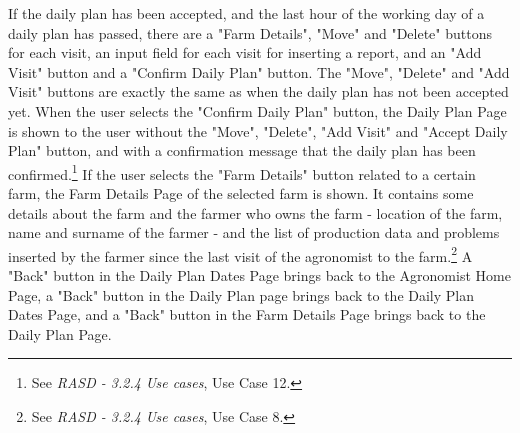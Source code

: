 \documentclass{article}
\begin{document}
If the daily plan has been accepted, and the last hour of the working day of a daily plan has passed, there are a "Farm Details", "Move" and "Delete" buttons for each visit, an input field for each visit for inserting a report, and an "Add Visit" button and a "Confirm Daily Plan" button. The "Move", "Delete" and "Add Visit" buttons are exactly the same as when the daily plan has not been accepted yet. When the user selects the "Confirm Daily Plan" button, the Daily Plan Page is shown to the user without the "Move", "Delete", "Add Visit" and "Accept Daily Plan" button, and with a confirmation message that the daily plan has been confirmed.\footnote{See \textit{RASD - 3.2.4 Use cases}, Use Case 12.} \newline
If the user selects the "Farm Details" button related to a certain farm, the Farm Details Page of the selected farm is shown. It contains some details about the farm and the farmer who owns the farm - location of the farm, name and surname of the farmer - and the list of production data and problems inserted by the farmer since the last visit of the agronomist to the farm.\footnote{See \textit{RASD - 3.2.4 Use cases}, Use Case 8.}\newline
A "Back" button in the Daily Plan Dates Page brings back to the Agronomist Home Page, a "Back" button in the Daily Plan page brings back to the Daily Plan Dates Page, and a "Back" button in the Farm Details Page brings back to the Daily Plan Page.
\end{document}
